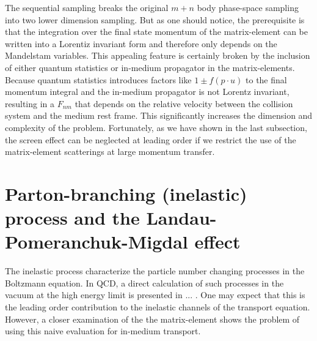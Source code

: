 The sequential sampling breaks the original $m+n$ body phase-space sampling into two lower dimension sampling.
But as one should notice, the prerequisite is that the integration over the final state momentum of the matrix-element can be written into a Lorentiz invariant form and therefore only depends on the Mandelstam variables.
This appealing feature is certainly broken by the inclusion of either
quantum statistics or in-medium propagator in the matrix-elements. 
Because quantum statistics introduces factors like $1\pm f(p\cdot u)$ to the final momentum integral and the in-medium propagator is not Lorentz invariant, resulting in a $F_{nm}$ that depends on the relative velocity between the collision system and the medium rest frame.
This significantly increases the dimension and complexity of the problem. 
Fortunately, as we have shown in the last subsection, the screen effect can be neglected at leading order if we restrict the use of the matrix-element scatterings at large momentum transfer. 

\section{Parton-branching (inelastic) process and the Landau-Pomeranchuk-Migdal effect}
The inelastic process characterize the particle number changing processes in the Boltzmann equation.
In QCD, a direct calculation of such processes in the vacuum at the high energy limit is presented in ... .
One may expect that this is the leading order contribution to the inelastic channels of the transport equation.
However, a closer examination of the the matrix-element shows the problem of using this naive evaluation for in-medium transport.

